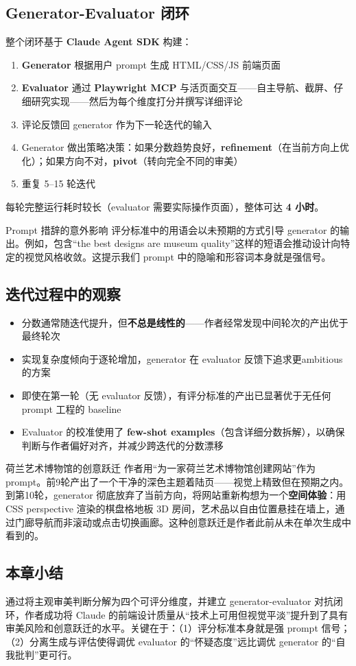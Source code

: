 \subsection{Generator-Evaluator 闭环}

整个闭环基于 \textbf{Claude Agent SDK} 构建：

\begin{enumerate}
    \item \textbf{Generator} 根据用户 prompt 生成 HTML/CSS/JS 前端页面
    \item \textbf{Evaluator} 通过 \textbf{Playwright MCP} 与活页面交互——自主导航、截屏、仔细研究实现——然后为每个维度打分并撰写详细评论
    \item 评论反馈回 generator 作为下一轮迭代的输入
    \item Generator 做出策略决策：如果分数趋势良好，\textbf{refinement}（在当前方向上优化）；如果方向不对，\textbf{pivot}（转向完全不同的审美）
    \item 重复 5--15 轮迭代
\end{enumerate}

每轮完整运行耗时较长（evaluator 需要实际操作页面），整体可达 \textbf{4 小时}。

\begin{warningbox}{Prompt 措辞的意外影响}
评分标准中的用语会以未预期的方式引导 generator 的输出。例如，包含``the best designs are museum quality''这样的短语会推动设计向特定的视觉风格收敛。这提示我们 prompt 中的隐喻和形容词本身就是强信号。
\end{warningbox}

\subsection{迭代过程中的观察}

\begin{itemize}
    \item 分数通常随迭代提升，但\textbf{不总是线性的}——作者经常发现中间轮次的产出优于最终轮次
    \item 实现复杂度倾向于逐轮增加，generator 在 evaluator 反馈下追求更ambitious 的方案
    \item 即使在第一轮（无 evaluator 反馈），有评分标准的产出已显著优于无任何 prompt 工程的 baseline
    \item Evaluator 的校准使用了 \textbf{few-shot examples}（包含详细分数拆解），以确保判断与作者偏好对齐，并减少跨迭代的分数漂移
\end{itemize}

\begin{knowledgebox}{荷兰艺术博物馆的创意跃迁}
作者用``为一家荷兰艺术博物馆创建网站''作为 prompt。前9轮产出了一个干净的深色主题着陆页——视觉上精致但在预期之内。到第10轮，generator 彻底放弃了当前方向，将网站重新构想为一个\textbf{空间体验}：用 CSS perspective 渲染的棋盘格地板 3D 房间，艺术品以自由位置悬挂在墙上，通过门廊导航而非滚动或点击切换画廊。这种创意跃迁是作者此前从未在单次生成中看到的。
\end{knowledgebox}

\subsection{本章小结}

通过将主观审美判断分解为四个可评分维度，并建立 generator-evaluator 对抗闭环，作者成功将 Claude 的前端设计质量从``技术上可用但视觉平淡''提升到了具有审美风险和创意跃迁的水平。关键在于：（1）评分标准本身就是强 prompt 信号；（2）分离生成与评估使得调优 evaluator 的``怀疑态度''远比调优 generator 的``自我批判''更可行。


